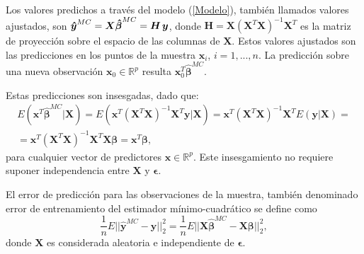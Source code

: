 \documentclass[a4paper,12pt]{report}
\begin{document}
Los valores predichos a través del modelo (\ref{Modelo}), también llamados valores ajustados, son $\boldsymbol{\hat{y}}^{MC}=\boldsymbol{X}\boldsymbol{\hat{\beta}}^{MC}=\boldsymbol{H} \hspace{0.05cm} \boldsymbol{y}$, donde $\boldsymbol{H}=\boldsymbol{X}(\boldsymbol{X}^T\boldsymbol{X})^{-1}\boldsymbol{X}^T$ es la matriz de proyección sobre el espacio de las columnas de $\boldsymbol{X}$. Estos valores ajustados son las predicciones en los puntos de la muestra $\boldsymbol{x}_i$, $i=1,...,n$. La predicción sobre una nueva observación $\boldsymbol{x}_0 \in \mathbb{R}^p$ resulta $\boldsymbol{x}_0^T\boldsymbol{\hat{\beta}}^{MC}$.

Estas predicciones son insesgadas, dado que:
\begin{gather}
\nonumber
E(\boldsymbol{x}^T\boldsymbol{\hat{\beta}}^{MC}|\boldsymbol{X}) =
E(\boldsymbol{x}^T(\boldsymbol{X}^T\boldsymbol{X})^{-1}\boldsymbol{X}^T\boldsymbol{y}|\boldsymbol{X}) =
\boldsymbol{x}^T(\boldsymbol{X}^T\boldsymbol{X})^{-1}\boldsymbol{X}^TE(\boldsymbol{y}|\boldsymbol{X}) = \\ 
\label{eq: pred_insesg}
=\boldsymbol{x}^T(\boldsymbol{X}^T\boldsymbol{X})^{-1}\boldsymbol{X}^T\boldsymbol{X}\boldsymbol{\beta} 
=\boldsymbol{x}^T\boldsymbol{\beta},
\end{gather}
para cualquier vector de predictores $\boldsymbol{x} \in \mathbb{R}^p$. Este insesgamiento no requiere suponer independencia entre $\boldsymbol{X}$ y $\boldsymbol{\epsilon}$.

El error de predicción para las observaciones de la muestra, también denominado error de entrenamiento del estimador mínimo-cuadrático se define como
\begin{equation}
\label{in_sample_risk}
\frac{1}{n}E||\boldsymbol{\hat{y}}^{MC}-\boldsymbol{y}||_2^2 = \frac{1}{n}E||\boldsymbol{X}\boldsymbol{\hat{\beta}}^{MC}-\boldsymbol{X}\boldsymbol{\beta}||_2^2,
\end{equation}
donde $\boldsymbol{X}$ es considerada aleatoria e independiente de $\boldsymbol{\epsilon}$.
\end{document}

